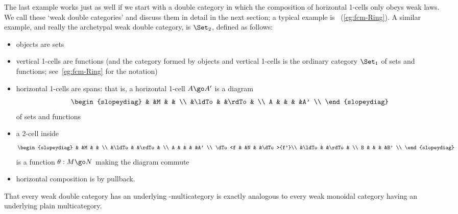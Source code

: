\begin{example}	
The last example works just as well if we start with a double category in
which the composition of horizontal 1-cells only obeys weak laws.  We call
these `weak%
%
%
%
%
double categories' and discuss them in detail in the next
section; a typical example is ~(\ref{eg:fcm-Ring}).  A similar
example, and really the archetypal weak double category, is $\Set_2$,%
% 
%
%
%
% 
defined as follows:
%
\begin{itemize}
\item objects are sets
\item vertical 1-cells are functions (and the category formed by objects
and vertical 1-cells is the ordinary category $\Set_1$ of sets and
functions; see~\ref{eg:fcm-Ring} for the notation)
\item horizontal 1-cells are spans:%
%
%
that is, a horizontal 1-cell $A \go A'$
is a diagram
\[
\begin{slopeydiag}
	&	&M	&	&	\\
	&\ldTo	&	&\rdTo	&	\\
A	&	&	&	&A'	\\
\end{slopeydiag}
\]
of sets and functions
\item a 2-cell inside
\[
\begin{slopeydiag}
	&	&M	&	&	\\
	&\ldTo	&	&\rdTo	&	\\
A	&	&	&	&A'	\\
\dTo<f	&	&N	&	&\dTo>{f'}\\
	&\ldTo	&	&\rdTo	&	\\
B	&	&	&	&B'	\\
\end{slopeydiag}
\]
is a function $\theta: M \go N$ making the diagram commute
\item horizontal composition is by pullback.
\end{itemize}
%
That every weak double category has an underlying \fc-multicategory is
exactly analogous to every weak monoidal category having an underlying
plain multicategory.
\end{example}

